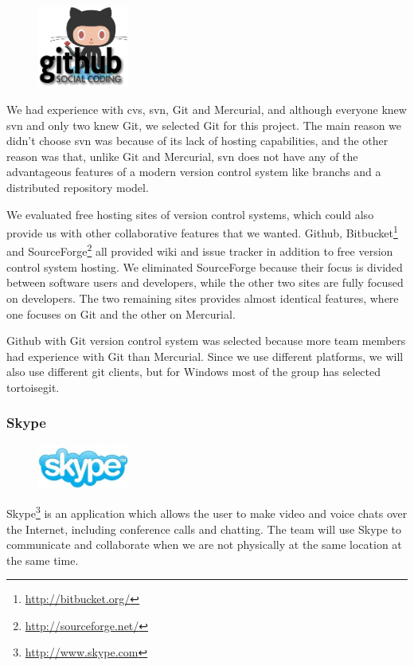 \begin{figure}
	\vspace{-20pt}
	\includegraphics[width=3cm]{./planning/img/github_logo}
	\vspace{-20pt}
\end{figure}
We had experience with \Gls{cvs}, \Gls{svn}, Git and Mercurial, and although everyone 
knew \Gls{svn} and only two knew Git, we selected Git for this project.
The main reason we didn't choose \Gls{svn} was because of its lack of hosting capabilities,
and the other reason was that, unlike Git and Mercurial, \Gls{svn}	 does not have any of the
advantageous features of a modern \gls{version control system} like \glspl{branch} and a \gls{distributed
repository model}.

We evaluated free hosting sites of \glspl{version control system}, which could also 
provide us with other collaborative features that we wanted. Github, 
Bitbucket\footnote{\url{http://bitbucket.org/}} and
SourceForge\footnote{\url{http://sourceforge.net/}} all provided wiki and
issue tracker in addition to free \gls{version control system} hosting. We eliminated 
SourceForge because their focus is divided between software users and 
developers, while the other two sites are fully focused on developers. The 
two remaining sites provides almost identical features, where one focuses on 
Git and the other on Mercurial.

Github with Git \gls{version control system} was selected because more team members 
had experience with Git than Mercurial. Since we use different platforms,
we will also use different git clients, but for Windows most of the group has
selected tortoisegit.

\subsubsection{Skype}
\begin{figure}
	\vspace{-20pt}
	\includegraphics[width=3cm]{./planning/img/skype_logo}
	\vspace{-20pt}
\end{figure}
Skype\footnote{\url{http://www.skype.com}} is an application which allows the
user to make video and voice chats over the Internet, including conference
calls and chatting. The team will use Skype to communicate and collaborate when
we are not physically at the same location at the same time.

